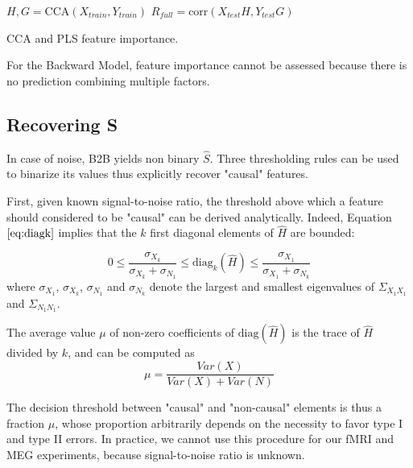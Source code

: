 \begin{algorithm}[H]
      $H, G = \text{CCA}(X_{train},
Y_{train})$\; $R_{full} = \text{corr}(X_{test} H, Y_{test} G)$\;

     
\caption{CCA and PLS feature importance.} \label{algorithm:cdp_fi}
\end{algorithm}

For the Backward Model, feature importance cannot be assessed because there is
no prediction combining multiple factors.

\subsection{Recovering S}
\label{recovering}

In case of noise, B2B yields non binary $\hat S$. Three thresholding rules can
be used to binarize its values thus explicitly recover "causal" features.

First, given known signal-to-noise ratio, the threshold above which a feature
should considered to be "causal" can be derived analytically. Indeed, Equation
$\ref{eq:diagk}$ implies that the $k$ first diagonal elements of $\hat H$ are
bounded:  %

$$0 \leq \frac{\sigma_{X_k}}{\sigma_{X_k} +\sigma_{N_1}} \leq
\text{diag}_k(\hat{H})\leq  \frac{\sigma_{X_1}}{\sigma_{X_1} +\sigma_{N_k}}$$
where $\sigma_{X_1}$, $\sigma_{X_k}$, $\sigma_{N_1}$ and $\sigma_{N_k}$ denote
the largest and smallest eigenvalues of $\Sigma_{X_1 X_1}$ and $\Sigma_{N_1
N_1}$.

The average value $\mu$ of non-zero coefficients of $\text{diag}(\hat H)$ is the
trace of $\hat H$ divided by $k$, and can be computed as
\begin{equation}
\mu = \frac{Var(X)}{Var(X)+Var(N)}
\end{equation}

The decision threshold between "causal" and "non-causal" elements is thus a fraction
$\mu$, whose proportion arbitrarily depends on the necessity to favor type I and
type II errors. In practice, we cannot use this procedure for our fMRI and MEG experiments,
because signal-to-noise ratio is unknown.

